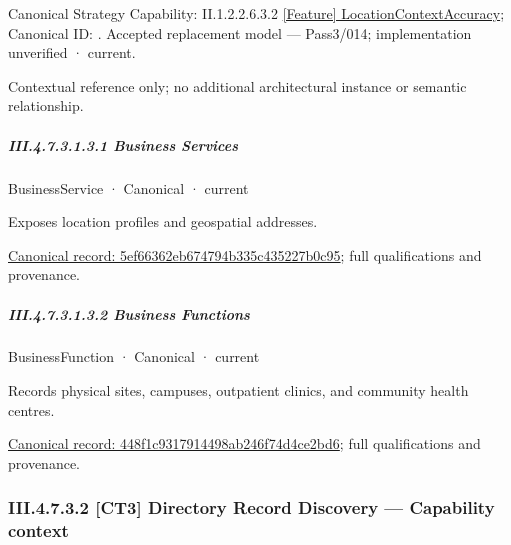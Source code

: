 {\small Canonical Strategy Capability: II.1.2.2.6.3.2 \hyperref[element:84742d2e91364e67ac72cce991bca3a6]{[Feature] LocationContextAccuracy}; Canonical ID: \texttt{}. Accepted replacement model — Pass3/014; implementation unverified · current.}\par
Contextual reference only; no additional architectural instance or semantic relationship.\par
\subparagraph*{III.4.7.3.1.3.1 Business Services}
\label{navigation:III.4.7.3.1.3.1}

\label{navigation:III.4.7.3.1.3.1.1}

\label{element:5ef66362eb674794b335c435227b0c95}
{\small BusinessService · Canonical · current}\par

Exposes location profiles and geospatial addresses.


{\footnotesize \href{../../../../../../../continuum/business/business-service/5ef66362eb674794b335c435227b0c95.md}{Canonical record: 5ef66362eb674794b335c435227b0c95}; full qualifications and provenance.}\par
\subparagraph*{III.4.7.3.1.3.2 Business Functions}
\label{navigation:III.4.7.3.1.3.2}

\label{navigation:III.4.7.3.1.3.2.1}

\label{element:448f1c9317914498ab246f74d4ce2bd6}
{\small BusinessFunction · Canonical · current}\par

Records physical sites, campuses, outpatient clinics, and community health centres.


{\footnotesize \href{../../../../../../../continuum/business/business-function/448f1c9317914498ab246f74d4ce2bd6.md}{Canonical record: 448f1c9317914498ab246f74d4ce2bd6}; full qualifications and provenance.}\par
\subsubsection*{III.4.7.3.2 [CT3] Directory Record Discovery — Capability context}
\label{navigation:III.4.7.3.2}

